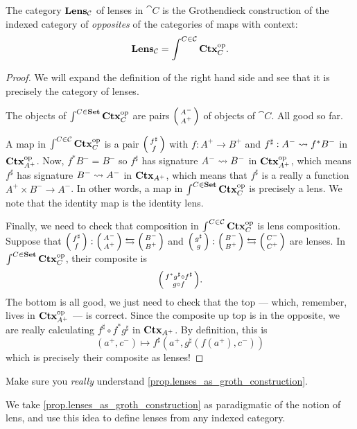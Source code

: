 \documentclass[DynamicalBook]{subfiles}
\begin{document}
\begin{proposition}\label{prop.lenses_as_groth_construction}
  The category $\textbf{Lens}_{\mathcal{C}}$ of lenses in $\cat{C}$ is the
  Grothendieck construction of the indexed category of \emph{opposites} of the
  categories of maps with context:
  $$\textbf{Lens}_{\mathcal{C}} = \int^{C \in \mathcal{C}} \textbf{Ctx}_{C}^{\textnormal{op}}.$$
\end{proposition}
\begin{proof}
We will expand the
definition of the right hand side and see that it is precisely the category of lenses.

The objects of $\int^{C \in \textbf{Set}} \textbf{Ctx}_{C}^{\textnormal{op}}$ are pairs $\lens{A^-}{A^+}$ of
objects of $\cat{C}$. All good so far.

A map in $\int^{C \in \mathcal{C}} \textbf{Ctx}_{C}^{\textnormal{op}}$ is a pair $\lens{f^{\sharp}}{f}$
with $f : A^+ \to B^+$ and $f^{\sharp} : A^- \rightsquigarrow f^{\ast} B^-$ in
$\textbf{Ctx}_{A^+}^{\textnormal{op}}$. Now, $f^{\ast}B^- = B^-$ so $f^{\sharp}$ has signature $A^-
\rightsquigarrow B^-$ in $\textbf{Ctx}_{A^+}^{\textnormal{op}}$, which means $f^{\sharp}$ has signature $B^-
\rightsquigarrow A^{-}$ in $\textbf{Ctx}_{A^+}$, which means that $f^{\sharp}$ is a really a
function $A^+ \times B^- \to A^{-}$. In other words, a map in $\int^{C \in \textbf{Set}}
\textbf{Ctx}_{C}^{\textnormal{op}}$ is precisely a lens. We note that the identity map is the identity lens.

Finally, we need to check that composition in $\int^{C \in \mathcal{C}} \textbf{Ctx}_{C}^{\textnormal{op}}$
is lens composition. Suppose that $\lens{f^{\sharp}}{f} :
  \lens{A^-}{A^+} \fromto \lens{B^-}{B^+}$ and $\lens{g^{\sharp}}{g} :
  \lens{B^-}{B^+} \fromto \lens{C^-}{C^+}$ are lenses. In $\int^{C \in \textbf{Set}}
  \textbf{Ctx}_{C}^{\textnormal{op}}$, their composite is
$$\lens{f^{\ast}g^{\sharp} \circ f^{\sharp}}{g \circ f}.$$
  The bottom is all good, we just need to check that the top --- which,
  remember, lives in $\textbf{Ctx}_{A^+}^{\textnormal{op}}$ --- is correct. Since the composite up top
  is in
  the opposite, we are really calculating $f^{\sharp} \circ f^{\ast} g^{\sharp}$
  in $\textbf{Ctx}_{A^+}$. By definition, this is
$$(a^+, c^-) \mapsto f^{\sharp}(a^+, g^{\sharp}(f(a^+), c^-))$$
which is precisely their composite as lenses!
\end{proof}

\begin{exercise}\label{ex.really_understand_charts_as_groth_construction}
  Make sure you \emph{really} understand \cref{prop.lenses_as_groth_construction}.
\end{exercise}

We take \cref{prop.lenses_as_groth_construction} as paradigmatic of the notion
of lens, and use this idea to define lenses from any indexed category.
\end{document}
